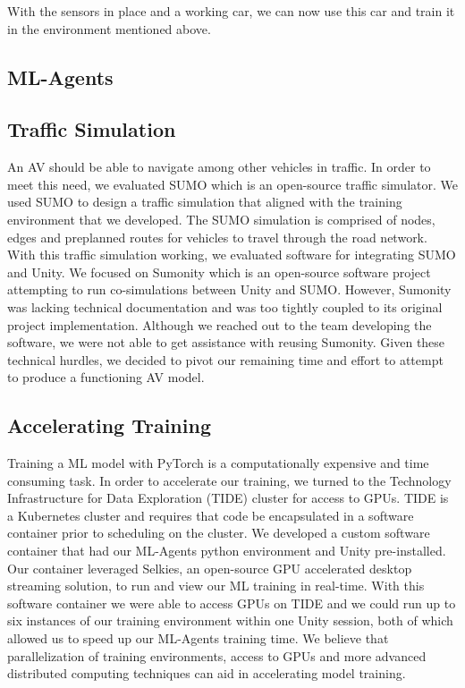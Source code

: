 \documentclass[conference]{IEEEtran}
\begin{document}
With the sensors in place and a working car, we can now use this car and train it in the environment mentioned above.

\subsection{ML-Agents}


\subsection{Traffic Simulation}
An AV should be able to navigate among other vehicles in traffic. 
In order to meet this need, we evaluated SUMO which is an open-source traffic simulator\cite{alvarezlopez2018}.
We used SUMO to design a traffic simulation that aligned with the training environment that we developed.
The SUMO simulation is comprised of nodes, edges and preplanned routes for vehicles to travel through the road network.
With this traffic simulation working, we evaluated software for integrating SUMO and Unity.
We focused on Sumonity which is an open-source software project attempting to run co-simulations between Unity and SUMO\cite{pechinger2024sumonity}.
However, Sumonity was lacking technical documentation and was too tightly coupled to its original project implementation. 
Although we reached out to the team developing the software, we were not able to get assistance with reusing Sumonity.
Given these technical hurdles, we decided to pivot our remaining time and effort to attempt to produce a functioning AV model.

\subsection{Accelerating Training}
Training a ML model with PyTorch is a computationally expensive and time consuming task.
In order to accelerate our training, we turned to the Technology Infrastructure for Data Exploration (TIDE) cluster for access to GPUs\cite{tidesdsu}.
TIDE is a Kubernetes cluster and requires that code be encapsulated in a software container prior to scheduling on the cluster.
We developed a custom software container that had our ML-Agents python environment and Unity pre-installed.
Our container leveraged Selkies, an open-source GPU accelerated desktop streaming solution, to run and view our ML training in real-time\cite{selkiestreamer}.
With this software container we were able to access GPUs on TIDE and we could run up to six instances of our training environment within one Unity session, both of which allowed us to speed up our ML-Agents training time.
We believe that parallelization of training environments, access to GPUs and more advanced distributed computing techniques can aid in accelerating model training.
\end{document}
